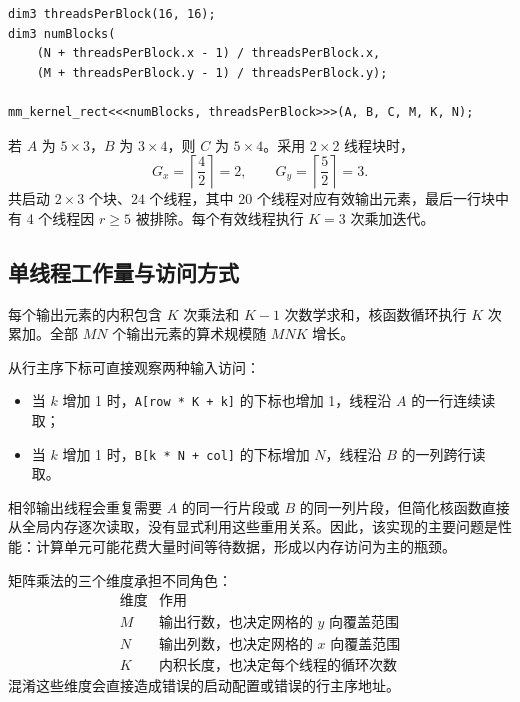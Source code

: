 \par\noindent\begin{minipage}{\linewidth}
\begin{lstlisting}[caption={矩形矩阵乘法的启动配置}]
dim3 threadsPerBlock(16, 16);
dim3 numBlocks(
    (N + threadsPerBlock.x - 1) / threadsPerBlock.x,
    (M + threadsPerBlock.y - 1) / threadsPerBlock.y);

mm_kernel_rect<<<numBlocks, threadsPerBlock>>>(A, B, C, M, K, N);
\end{lstlisting}
\end{minipage}\par

\begin{examplebox}[title=输出空间决定启动空间]
若 $A$ 为 $5\times3$，$B$ 为 $3\times4$，则 $C$ 为 $5\times4$。采用 $2\times2$ 线程块时，
\[
G_x=\left\lceil\frac{4}{2}\right\rceil=2,
\qquad
G_y=\left\lceil\frac{5}{2}\right\rceil=3.
\]
共启动 $2\times3$ 个块、$24$ 个线程，其中 $20$ 个线程对应有效输出元素，最后一行块中有 4 个线程因 $r\geq5$ 被排除。每个有效线程执行 $K=3$ 次乘加迭代。
\end{examplebox}

\subsection{单线程工作量与访问方式}

每个输出元素的内积包含 $K$ 次乘法和 $K-1$ 次数学求和，核函数循环执行 $K$ 次累加。全部 $MN$ 个输出元素的算术规模随 $MNK$ 增长。

从行主序下标可直接观察两种输入访问：
\begin{itemize}
  \item 当 $k$ 增加 1 时，\texttt{A[row * K + k]} 的下标也增加 1，线程沿 $A$ 的一行连续读取；
  \item 当 $k$ 增加 1 时，\texttt{B[k * N + col]} 的下标增加 $N$，线程沿 $B$ 的一列跨行读取。
\end{itemize}

相邻输出线程会重复需要 $A$ 的同一行片段或 $B$ 的同一列片段，但简化核函数直接从全局内存逐次读取，没有显式利用这些重用关系。因此，该实现的主要问题是性能：计算单元可能花费大量时间等待数据，形成以内存访问为主的瓶颈。

\begin{keybox}
矩阵乘法的三个维度承担不同角色：
\[
\begin{array}{c|c}
\text{维度} & \text{作用}\\
\hline
M & \text{输出行数，也决定网格的 }y\text{ 向覆盖范围}\\
N & \text{输出列数，也决定网格的 }x\text{ 向覆盖范围}\\
K & \text{内积长度，也决定每个线程的循环次数}
\end{array}
\]
混淆这些维度会直接造成错误的启动配置或错误的行主序地址。
\end{keybox}
